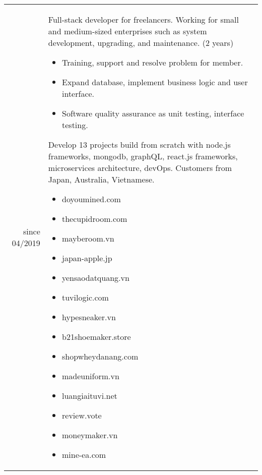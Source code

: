 \documentclass[10pt]{article} %
\begin{document}
\begin{tabular}{r|p{}}
  since 04/2019             	& Full-stack developer for freelancers. Working for small and medium-sized enterprises such as system development, upgrading, and maintenance. (2 years)		
  \begin{itemize}
    \item Training, support and resolve problem for member.
    \item Expand database, implement business logic and user interface.
    \item Software quality assurance as unit testing, interface testing.
  \end{itemize}
  Develop 13 projects build from scratch with node.js frameworks, mongodb, graphQL, react.js frameworks, microservices architecture, devOps. Customers from Japan, Australia, Vietnamese.
  \begin{itemize}
    \item doyoumined.com
    \item thecupidroom.com
    \item mayberoom.vn
    \item japan-apple.jp
    \item yensaodatquang.vn
    \item tuvilogic.com
    \item hypesneaker.vn
    \item b21shoemaker.store
    \item shopwheydanang.com
    \item madeuniform.vn
    \item luangiaituvi.net
    \item review.vote
    \item moneymaker.vn 
    \item mine-ea.com 
  \end{itemize}
\end{tabular}


\pagebreak
\end{document}
